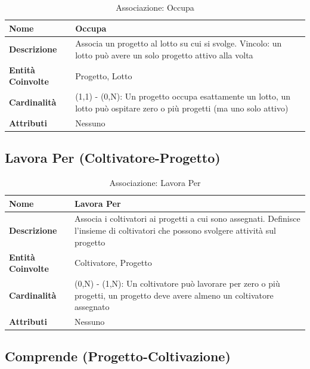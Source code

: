\documentclass[12pt,a4paper]{article}
\begin{document}
\begin{table}[H]
\centering
\caption{Associazione: Occupa}
\begin{tabularx}{\textwidth}{|l|X|}
\hline
\textbf{Nome} & Occupa \\
\hline
\textbf{Descrizione} & Associa un progetto al lotto su cui si svolge. Vincolo: un lotto può avere un solo progetto attivo alla volta \\
\hline
\textbf{Entità Coinvolte} & Progetto, Lotto \\
\hline
\textbf{Cardinalità} & (1,1) - (0,N): Un progetto occupa esattamente un lotto, un lotto può ospitare zero o più progetti (ma uno solo attivo) \\
\hline
\textbf{Attributi} & Nessuno \\
\hline
\end{tabularx}
\end{table}

\subsection{Lavora Per (Coltivatore-Progetto)}

\begin{table}[H]
\centering
\caption{Associazione: Lavora Per}
\begin{tabularx}{\textwidth}{|l|X|}
\hline
\textbf{Nome} & Lavora Per \\
\hline
\textbf{Descrizione} & Associa i coltivatori ai progetti a cui sono assegnati. Definisce l'insieme di coltivatori che possono svolgere attività sul progetto \\
\hline
\textbf{Entità Coinvolte} & Coltivatore, Progetto \\
\hline
\textbf{Cardinalità} & (0,N) - (1,N): Un coltivatore può lavorare per zero o più progetti, un progetto deve avere almeno un coltivatore assegnato \\
\hline
\textbf{Attributi} & Nessuno \\
\hline
\end{tabularx}
\end{table}

\subsection{Comprende (Progetto-Coltivazione)}
\end{document}
